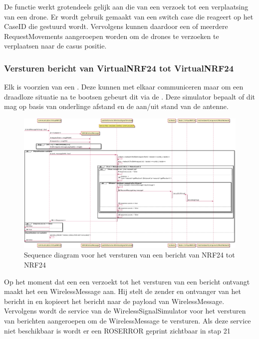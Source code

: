 \documentclass[a4paper, 11pt, oneside]{report}
\begin{document}
De functie werkt grotendeels gelijk aan die van een verzoek tot een verplaatsing van een drone. 
Er wordt gebruik gemaakt van een switch case die reageert op het CaseID die gestuurd wordt.
Vervolgens kunnen daardoor een of meerdere RequestMovements aangeroepen worden om de drones te verzoeken te verplaatsen naar de casus positie. 

\subsubsection{Versturen bericht van VirtualNRF24 tot VirtualNRF24}
\label{DetailedDesign:ros:sequence:sendmessage}

Elk  is voorzien van een .
Deze kunnen met elkaar communiceren maar om een draadloze situatie na te bootsen gebeurt dit via de .
Deze simulator bepaalt of dit mag op basis van onderlinge afstand en de aan/uit stand van de antenne.

\begin{figure}[H]
	\begin{center}\includegraphics[width=\linewidth]{UML/out/ros/sequence/SendMessage/SendMessage.png}\end{center}
	\caption{Sequence diagram voor het versturen van een bericht van NRF24 tot NRF24}
	\label{fig:ros:sequence:sequence:sendmessage}
\end{figure}

Op het moment dat een  een verzoekt tot het versturen van een bericht ontvangt maakt het een WirelessMessage aan.
Hij stelt de zender en ontvanger van het bericht in en kopieert het bericht naar de payload van WirelessMessage.
Vervolgens wordt de service van de WirelessSignalSimulator voor het versturen van berichten aangeroepen om de WirelessMessage te versturen.
Als deze service niet beschikbaar is wordt er een ROS\textunderscore ERROR geprint zichtbaar in stap 21
\end{document}
